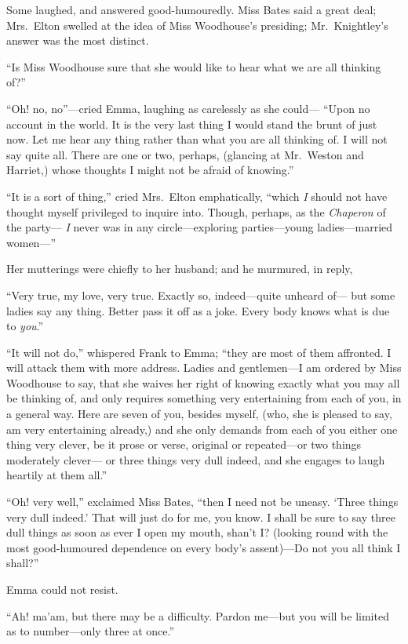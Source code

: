 Some laughed, and answered good-humouredly. Miss Bates said a great deal;
Mrs.\ Elton swelled at the idea of Miss Woodhouse's presiding;
Mr.\ Knightley's answer was the most distinct.

``Is Miss Woodhouse sure that she would like to hear what we are
all thinking of?''

``Oh! no, no''---cried Emma, laughing as carelessly as she could---%
``Upon no account in the world.  It is the very last thing I
would stand the brunt of just now.  Let me hear any thing rather
than what you are all thinking of.  I will not say quite all.
There are one or two, perhaps, (glancing at Mr.\ Weston and Harriet,)
whose thoughts I might not be afraid of knowing.''

``It is a sort of thing,'' cried Mrs.\ Elton emphatically,
``which \emph{I} should not have thought myself privileged to
inquire into.  Though, perhaps, as the \emph{Chaperon} of the party---%
\emph{I} never was in any circle---exploring parties---young ladies---married women---''

Her mutterings were chiefly to her husband; and he murmured,
in reply,

``Very true, my love, very true.  Exactly so, indeed---quite unheard of---%
but some ladies say any thing.  Better pass it off as a joke.
Every body knows what is due to \emph{you}.''

``It will not do,'' whispered Frank to Emma; ``they are most
of them affronted.  I will attack them with more address.
Ladies and gentlemen---I am ordered by Miss Woodhouse to say, that she
waives her right of knowing exactly what you may all be thinking of,
and only requires something very entertaining from each of you,
in a general way.  Here are seven of you, besides myself, (who, she
is pleased to say, am very entertaining already,) and she only
demands from each of you either one thing very clever, be it prose
or verse, original or repeated---or two things moderately clever---%
or three things very dull indeed, and she engages to laugh heartily
at them all.''

``Oh! very well,'' exclaimed Miss Bates, ``then I need not be uneasy.
`Three things very dull indeed.'  That will just do for me, you know.
I shall be sure to say three dull things as soon as ever I open
my mouth, shan't I? (looking round with the most good-humoured
dependence on every body's assent)---Do not you all think I shall?''

Emma could not resist.

``Ah! ma'am, but there may be a difficulty.  Pardon me---but you
will be limited as to number---only three at once.''

